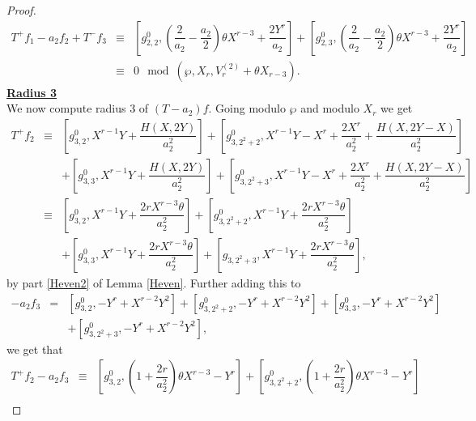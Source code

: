\documentclass[11pt, reqno]{amsart}
\numberwithin{equation}{section}
\theoremstyle{definition}
\theoremstyle{remark}
\theoremstyle{definition}
\theoremstyle{remark}
\theoremstyle{remark}
\begin{document}
\begin{proof}
\begin{eqnarray*}
    T^{+}f_{1}-a_{2}f_{2}+T^{-}f_{3}&\equiv&\left[g_{2,2}^{0}, \left(\dfrac{2}{a_{2}}-\dfrac{a_{2}}{2}\right)\theta X^{r-3}+\dfrac{2Y^{r}}{a_{2}}\right]
    + \left[g_{2,3}^{0}, \left(\dfrac{2}{a_{2}}-\dfrac{a_{2}}{2}\right)\theta X^{r-3}+ \dfrac{2Y^{r}}{a_{2}}\right] \nonumber\\
    &\equiv& 0\mod(\wp,X_{r},V_{r}^{(2)}+\theta X_{r-3}).
\end{eqnarray*}
\noindent\underline{\textbf{Radius 3}}\\
We now compute radius $3$ of $(T-a_{2})f$. Going modulo $\wp$ and modulo $X_{r}$ we get
\begin{eqnarray}
    T^{+}f_{2} &\equiv& \left[g_{3,2}^{0}, X^{r-1}Y+\dfrac{H(X,2Y)}{a_{2}^2}\right] + \left[g_{3,2^2+2}^{0}, X^{r-1}Y-X^{r}+ \dfrac{2X^{r}}{a_{2}^2} + \dfrac{H(X,2Y-X)}{a_{2}^2}\right]\nonumber\\
    && + \left[g_{3,3}^{0},X^{r-1}Y+\dfrac{H(X,2Y)}{a_{2}^2}\right] + \left[g_{3,2^2+3}^{0}, X^{r-1}Y-X^{r}+ \dfrac{2X^{r}}{a_{2}^2} + \dfrac{H(X,2Y-X)}{a_{2}^2}\right] \nonumber\\
    &\equiv& \left[g_{3,2}^{0}, X^{r-1}Y + \dfrac{2rX^{r-3}\theta}{a_{2}^2}\right] + \left[g_{3,2^2+2}^{0}, X^{r-1}Y+ \dfrac{2rX^{r-3}\theta}{a_{2}^2}\right]\nonumber\\
    & & +\left[g_{3,3}^{0},X^{r-1}Y + \dfrac{2rX^{r-3}\theta}{a_{2}^2}\right] + \left[g_{3,2^2+3},X^{r-1}Y +\dfrac{2rX^{r-3}\theta}{a_{2}^2}\right], \label{F3'T+f2}     
    \end{eqnarray}
 by part \eqref{Heven2} of Lemma \ref{Heven}. Further adding this to
\begin{eqnarray}\label{F3'a2f3}
  -a_{2}f_{3} &=& \left[g_{3,2}^{0}, -Y^{r}+X^{r-2}Y^{2}\right]  + \left[g_{3,2^{2}+2}^{0},-Y^{r}+X^{r-2}Y^{2}\right] + \left[g_{3,3}^{0}, -Y^{r}+X^{r-2}Y^{2}\right] \nonumber\\
  & &+ \left[g_{3,2^2+3}^{0},-Y^{r}+X^{r-2}Y^{2}\right],
\end{eqnarray}
we get that
\begin{eqnarray*}
  T^{+}f_{2}-a_{2}f_{3} &\equiv& \left[g_{3,2}^{0}, \left(1+\dfrac{2r}{a_{2}^2}\right)\theta X^{r-3} -Y^{r}\right] + \left[g_{3,2^2+2}^{0},\left(1+\dfrac{2r}{a_{2}^2}\right)\theta X^{r-3} -Y^{r}\right] \nonumber\\

\end{eqnarray*}
\end{proof}
\end{document}

